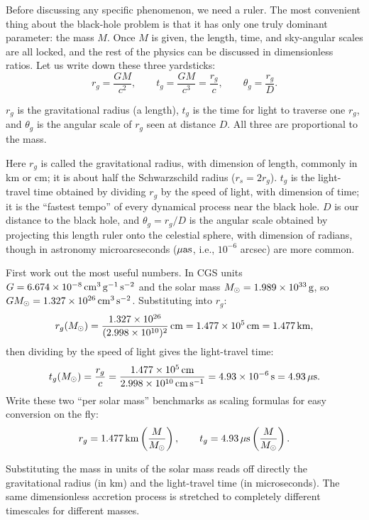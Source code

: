 Before discussing any specific phenomenon, we need a ruler. The most convenient thing about the black-hole problem is that it has only one truly dominant parameter: the mass \(M\). Once \(M\) is given, the length, time, and sky-angular scales are all locked, and the rest of the physics can be discussed in dimensionless ratios. Let us write down these three yardsticks:
\begin{equation}
  r_g=\frac{GM}{c^2},\qquad
  t_g=\frac{GM}{c^3}=\frac{r_g}{c},\qquad
  \theta_g=\frac{r_g}{D}.
  \label{eq:e19-scales}
\end{equation}
\begin{formulaexplain}
\(r_g\) is the gravitational radius (a length), \(t_g\) is the time for light to traverse one \(r_g\), and \(\theta_g\) is the angular scale of \(r_g\) seen at distance \(D\). All three are proportional to the mass.
\end{formulaexplain}
Here \(r_g\) is called the gravitational radius, with dimension of length, commonly in km or cm; it is about half the Schwarzschild radius (\(r_s=2r_g\)). \(t_g\) is the light-travel time obtained by dividing \(r_g\) by the speed of light, with dimension of time; it is the ``fastest tempo'' of every dynamical process near the black hole. \(D\) is our distance to the black hole, and \(\theta_g=r_g/D\) is the angular scale obtained by projecting this length ruler onto the celestial sphere, with dimension of radians, though in astronomy microarcseconds (\(\mu{\rm as}\), i.e., \(10^{-6}\) arcsec) are more common.

First work out the most useful numbers. In CGS units \(G=6.674\times10^{-8}\,{\rm cm^3\,g^{-1}\,s^{-2}}\) and the solar mass \(M_\odot=1.989\times10^{33}\,{\rm g}\), so \(GM_\odot=1.327\times10^{26}\,{\rm cm^3\,s^{-2}}\). Substituting into \(r_g\):
\[
  r_g(M_\odot)=\frac{1.327\times10^{26}}{(2.998\times10^{10})^2}\,{\rm cm}
  =1.477\times10^{5}\,{\rm cm}=1.477\,{\rm km},
\]
then dividing by the speed of light gives the light-travel time:
\[
  t_g(M_\odot)=\frac{r_g}{c}=\frac{1.477\times10^{5}\,{\rm cm}}{2.998\times10^{10}\,{\rm cm\,s^{-1}}}
  =4.93\times10^{-6}\,{\rm s}=4.93\,\mu{\rm s}.
\]
Write these two ``per solar mass'' benchmarks as scaling formulas for easy conversion on the fly:
\begin{equation}
  r_g=1.477\,{\rm km}\left(\frac{M}{M_\odot}\right),\qquad
  t_g=4.93\,\mu{\rm s}\left(\frac{M}{M_\odot}\right).
  \label{eq:e19-scalenum}
\end{equation}
\begin{formulaexplain}
Substituting the mass in units of the solar mass reads off directly the gravitational radius (in km) and the light-travel time (in microseconds). The same dimensionless accretion process is stretched to completely different timescales for different masses.
\end{formulaexplain}

